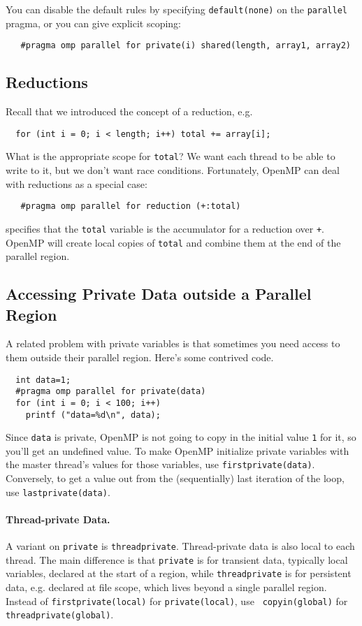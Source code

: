 You can disable the default rules by specifying {\tt default(none)}
on the {\tt parallel} pragma, or you can give explicit scoping:

\verb+   #pragma omp parallel for private(i) shared(length, array1, array2)+

\subsection*{Reductions}
Recall that we introduced the concept of a reduction, e.g.
{\small
\begin{verbatim}
  for (int i = 0; i < length; i++) total += array[i];
\end{verbatim}
}
What is the appropriate scope for {\tt total}? We want each thread
to be able to write to it, but we don't want race conditions.
Fortunately, OpenMP can deal with reductions as a special case:

\verb!   #pragma omp parallel for reduction (+:total)!

\noindent
specifies that the {\tt total} variable is the accumulator for a
reduction over {\tt +}. OpenMP will create local copies of {\tt total} and 
combine them at the end of the parallel region.

\subsection*{Accessing Private Data outside a Parallel Region}
A related problem with private variables is that sometimes you need 
access to them outside their parallel region. Here's some contrived code.

{\small
\begin{verbatim}
  int data=1;
  #pragma omp parallel for private(data)
  for (int i = 0; i < 100; i++)
    printf ("data=%d\n", data);
\end{verbatim}
}
Since {\tt data} is private, OpenMP is not going to copy in the
initial value {\tt 1} for it, so you'll get an undefined value.  To
make OpenMP initialize private variables with the master thread's
values for those variables, use {\tt firstprivate(data)}.  Conversely,
to get a value out from the (sequentially) last iteration of the loop,
use {\tt lastprivate(data)}.

\paragraph{Thread-private Data.} A variant on {\tt private} is
{\tt threadprivate}. Thread-private data is also local to each
thread. The main difference is that {\tt private} is for transient
data, typically local variables, declared at the start of a region,
while {\tt threadprivate} is for persistent data, e.g. declared at
file scope, which lives beyond a single parallel region. Instead of
{\tt firstprivate(local)} for {\tt private(local)}, use {\tt
  copyin(global)} for {\tt threadprivate(global)}.

